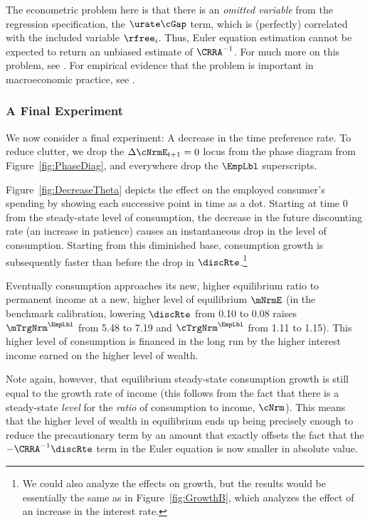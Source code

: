 \documentclass{econark}
\begin{document}
The econometric problem here is that there is an {\it omitted
variable} from the regression specification, the $\urate \cGap$ term, which is (perfectly) correlated with the included
variable $\rfree_{i}$.  Thus, Euler equation estimation cannot be expected to
return an unbiased estimate of $\CRRA^{-1}$.  For much more on this
problem, see \cite{carroll:death}.  For empirical evidence
that the problem is important in macroeconomic practice, see \cite{ParkerPrestonPrecaution}.

\subsubsection{A Final Experiment}\label{sec:FinalExperiment}
We now consider a final experiment: A decrease in the time preference
rate.  To reduce clutter, we drop the $\Delta \cNrmE_{t+1}=0$ locus from the 
phase diagram from Figure~\ref{fig:PhaseDiag}, and everywhere drop the $\EmpLbl$ superscripts.

Figure~\ref{fig:DecreaseTheta} depicts the effect on the 
employed consumer's spending by
showing each successive point in time as a dot.  
Starting at time 0 from the steady-state level of consumption, the
decrease in the future discounting rate (an increase in patience) causes
an instantaneous drop in the level of consumption.  Starting from this diminished 
base, consumption growth is subsequently faster than before the drop in $\discRte$.\footnote{We could also analyze the effects on growth, but the
  results would be essentially the same as in Figure~\ref{fig:GrowthB},
  which analyzes the effect of an increase in the interest rate.}

Eventually consumption approaches its new, higher equilibrium ratio
to permanent income at a new, higher level of equilibrium $\mNrmE$ (in the benchmark calibration, lowering $\discRte$ from 0.10 to 0.08 raises $\mTrgNrm^{\EmpLbl}$ from 5.48 to 7.19 and $\cTrgNrm^{\EmpLbl}$ from 1.11 to 1.15).  This
higher level of consumption is financed in the long run by the higher
interest income earned on the higher level of wealth.

Note again, however, that equilibrium steady-state 
consumption growth is still equal to the growth rate of income (this follows
from the fact that there is a steady-state {\it level} for the {\it
  ratio} of consumption to income, $\cNrm$).  This means that the higher
level of wealth in equilibrium ends up being precisely enough to
reduce the precautionary term by an amount that exactly offsets the
fact that the $-\CRRA^{-1}\discRte$ term in the Euler equation is now
smaller in absolute value.
\end{document}
